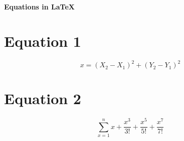 \documentclass[10pt , a4paper]{article}
\begin{document}
\begin{center}
    \Large{\textbf{Equations in \LaTeX}}
\end{center}
\section*{Equation 1}
\begin{equation}
    x=(X_2 - X_1)^2 + (Y_2 - Y_1)^2 
\end{equation}
\section*{Equation 2}
\begin{equation}
     \sum_{x=1}^{n} x + \frac{x^3}{3!} + \frac{x^5}{5!} + \frac{x^7}{7!} 
\end{equation}
\end{document}
